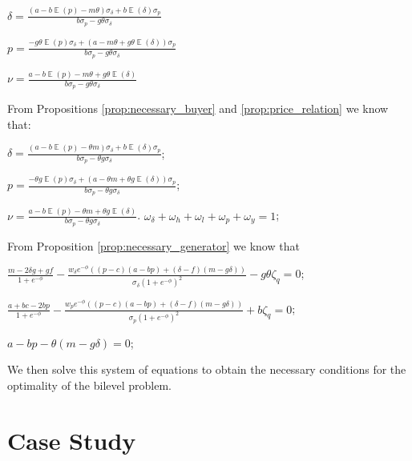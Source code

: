 \documentclass[informs]{informs3}
\begin{document}
\begin{proposition}\label{prop:solution_simple}


$\delta = \frac{\left(a - b\mathop{\mathbb{E}}\left(p\right)- m \theta \right) \sigma_{\delta}  + b\mathop{\mathbb{E}}\left(\delta\right) \sigma_{p} }{b \sigma_{p} -  g \theta \sigma_{\delta}}$


$p = \frac{- g \theta \mathop{\mathbb{E}}\left(p\right) \sigma_{\delta}  + 
\left(a-m \theta+
g \theta \mathop{\mathbb{E}}\left(\delta\right) 
\right) \sigma_{p} }{b \sigma_{p} -  g \theta \sigma_{\delta}}$


$\nu = \frac{a - b \mathop{\mathbb{E}}\left(p\right) - m \theta +  g \theta \mathop{\mathbb{E}}\left(\delta\right) }{b \sigma_{p} -  g \theta \sigma_{\delta}}$

\end{proposition}
%
From Propositions \ref{prop:necessary_buyer} and \ref{prop:price_relation} we know that:

$\delta=\frac{\left(a-b\mathop{\mathbb{E}}\left(p\right) -\theta m\right)\sigma_{\delta}+b\mathop{\mathbb{E}}\left(\delta\right)\sigma_{p}}{b\sigma_{p}-\theta g\sigma_{\delta}}$;

$p =\frac{-\theta g \mathop{\mathbb{E}}\left(p\right)\sigma_{\delta}+\left(a-\theta m+\theta g \mathop{\mathbb{E}}\left(\delta\right)\right)\sigma_{p}}{b\sigma_{p}-\theta g\sigma_{\delta}}$;

$\nu =\frac{a-b \mathop{\mathbb{E}}\left(p\right)-\theta m+\theta g \mathop{\mathbb{E}}\left(\delta\right)}{b\sigma_{p}-\theta g\sigma_{\delta}}$.
$\omega_{\delta}+\omega_{h}+\omega_{l}+\omega_{p}+\omega_{y}=1$;		

From Proposition \ref{prop:necessary_generator} we know that 

$\frac{m-2\delta g + g f}{1+e^{-\phi}}-\frac{w_{\delta} e^{-\phi} \left(\left(p-c\right)(a - bp )  +\left(\delta-f\right)(m -g\delta)\right)}{\sigma_{\delta}(1+e^{-\phi})^{2}}-g \theta \zeta_q =0$;

$\frac{a+bc-2bp}{1+e^{-\phi}}-\frac{w_p e^{-\phi} \left(\left(p-c\right)(a - bp )  +\left(\delta-f\right)(m -g\delta)\right)}{\sigma_{p}(1+e^{-\phi})^{2}}+b \zeta_q =0$;

$a - bp -\theta (m -g\delta)= 0$; 

We then solve this system of equations to obtain the necessary conditions for the optimality of the bilevel problem.
\Halmos
\endproof 


\section{Case Study}\label{Section_CaseStudy}
\end{document}
